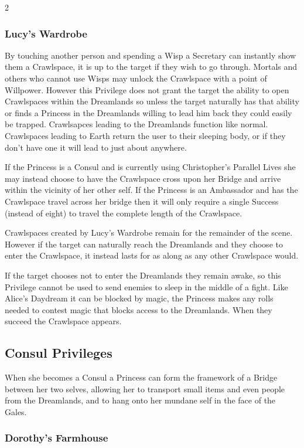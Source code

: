\begin{multicols}{2}
\subsubsection*{Lucy's Wardrobe}

By touching another person and spending a Wisp a Secretary can instantly show them a Crawlspace, it is up to the target if they wish to go through. Mortals and others who cannot use Wisps may unlock the Crawlspace with a point of Willpower. However this Privilege does not grant the target the ability to open Crawlspaces within the Dreamlands so unless the target naturally has that ability or finds a Princess in the Dreamlands willing to lead him back they could easily be trapped. Crawlsapces leading to the Dreamlands function like normal. Crawlspaces leading to Earth return the user to their sleeping body, or if they don't have one it will lead to just about anywhere. 

If the Princess is a Consul and is currently using Christopher's Parallel Lives she may instead choose to have the Crawlspace cross upon her Bridge and arrive within the vicinity of her other self. If the Princess is an Ambassador and has the Crawlspace travel across her bridge then it will only require a single Success (instead of eight) to travel the complete length of the Crawlspace. 

Crawlspaces created by Lucy's Wardrobe remain for the remainder of the scene. However if the target can naturally reach the Dreamlands and they choose to enter the Crawlspace, it instead lasts for as along as any other Crawlspace would.

If the target chooses not to enter the Dreamlands they remain awake, so this Privilege cannot be used to send enemies to sleep in the middle of a fight. Like Alice's Daydream it can be blocked by magic, the Princess makes any rolls needed to contest magic that blocks access to the Dreamlands. When they succeed the Crawlspace appears.

\subsection*{Consul Privileges}

When she becomes a Consul a Princess can form the framework of a Bridge between her two selves, allowing her to transport small items and even people from the Dreamlands, and to hang onto her mundane self in the face of the Gales. 

\subsubsection*{Dorothy's Farmhouse}


\end{multicols}
